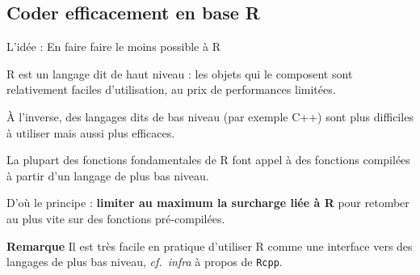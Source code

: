 \documentclass[12pt,ignorenonframetext,handout,]{beamer}
\newcommand{\intertitre}[1]{\textcolor{redInsee}{\textbf{#1}}}
\begin{document}
\hypertarget{coder-efficacement-en-base-r}{%
\subsection{Coder efficacement en base
R}\label{coder-efficacement-en-base-r}}

\begin{frame}[fragile]{L’idée : En faire faire le moins possible à R}
\protect\hypertarget{lidee-en-faire-faire-le-moins-possible-a-r}{}

R est un langage dit \og de haut niveau \fg{} : les objets qui le
composent sont relativement faciles d’utilisation, au prix de
performances limitées.

\vfill

À l’inverse, des langages dits de \og bas niveau \fg{} (par exemple C++)
sont plus difficiles à utiliser mais aussi plus efficaces.

\vfill

\pause La plupart des fonctions fondamentales de R font appel à des
fonctions compilées à partir d’un langage de plus bas niveau.

\vfill

D’où le principe : \textbf{limiter au maximum la surcharge liée à R}
pour retomber au plus vite sur des fonctions pré-compilées.

\pause \vfill

\intertitre{Remarque} Il est très facile en pratique d’utiliser R comme
une interface vers des langages de plus bas niveau, \emph{cf.~infra} à
propos de \texttt{Rcpp}.

\end{frame}
\end{document}
